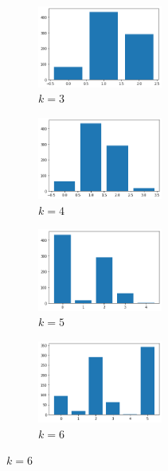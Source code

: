 \begin{figure}[H]
\begin{subfigure}{.5\textwidth}
  \centering
  \includegraphics[width=0.45\textwidth]{imagenes/counter/salida/agg3.png}
  \caption{$k=3$}
\end{subfigure}%
\begin{subfigure}{.5\textwidth}
  \centering
  \includegraphics[width=0.45\textwidth]{imagenes/counter/salida/agg4.png}
  \caption{$k=4$}
\end{subfigure}
\begin{subfigure}{.5\textwidth}
  \centering
  \includegraphics[width=0.45\textwidth]{imagenes/counter/salida/agg5.png}
  \caption{$k=5$}
\end{subfigure}
\begin{subfigure}{.5\textwidth}
  \centering
  \includegraphics[width=0.45\textwidth]{imagenes/counter/salida/agg6.png}
  \caption{$k=6$}

\end{subfigure}
\end{figure}
